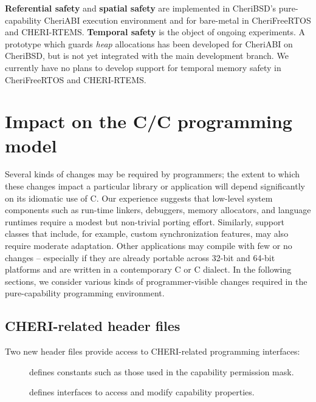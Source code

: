 \documentclass[12pt,twoside,openright,a4paper]{article}
\newcommand{\ccode}[1]{{\small\ttfamily{#1}}}
\newcommand{\pathname}[1]{{\ccode{#1}}}
\newcommand{\note}[2]{{\color{blue}[ Note: #1 - #2]}}
\renewcommand{\note}[2]{\relax\ifhmode\unskip\fi}
\newcommand{\psnote}[1]{\note{#1}{Peter S.}}
\newcommand*{\cpp}[1][]{C\textsmaller[2]{\nolinebreak[4]\hspace{-.05em}\raisebox{.45ex}{\textbf{++}}}}
\newcommand*{\cppInHeader}[1][]{\texorpdfstring{\cpp{}}{C++}}
\begin{document}
\textbf{Referential safety} and \textbf{spatial safety} are
implemented in CheriBSD's pure-capability CheriABI execution
environment and for bare-metal in CheriFreeRTOS and CHERI-RTEMS.
\textbf{Temporal safety} is the object of ongoing experiments.  A prototype which
guards \emph{heap} allocations has been developed for CheriABI on CheriBSD, but
is not yet integrated with the main development branch.
We currently have no plans to develop support for temporal memory safety in
CheriFreeRTOS and CHERI-RTEMS.

%

\section{Impact on the C/\cppInHeader{} programming model}
\psnote{kinds/types, to avoid needless mental disambiguation}
Several kinds of changes may be required by programmers; the extent to which
these changes impact a particular library or application will depend
significantly on its idiomatic use of C.
Our experience suggests that low-level system components such as run-time
linkers, debuggers, memory allocators, and language runtimes require a modest
but non-trivial porting effort.
Similarly, support classes that include, for example, custom synchronization
features, may also require moderate adaptation.
Other applications may compile with few or no changes -- especially if they
are already portable across 32-bit and 64-bit platforms and are written in a contemporary C or \cpp{} dialect.
In the following sections, we consider various kinds of programmer-visible
changes required in the pure-capability programming environment.

\subsection{CHERI-related header files}

Two new header files provide access to CHERI-related programming interfaces:

\begin{description}
\item[\pathname{cheri/cheri.h}] defines constants such as those used in the
  capability permission mask.

\item[\pathname{cheri/cheric.h}] defines interfaces to access and
  modify capability properties.
\end{description}
\end{document}

